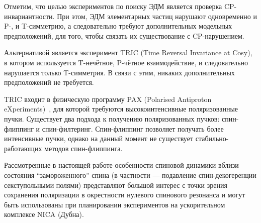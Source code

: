 
Отметим, что целью экспериментов по поиску ЭДМ является проверка CP-инвариантности. При этом, ЭДМ элементарных частиц нарушают одновременно и P-, и T-симметрию, а следовательно требуют дополнительных модельных предположений, для того, чтобы связать их существование с CP-нарушением.~\cite[стр.~1926]{Aksentev:TRIC}

Альтернативой является эксперимент TRIC (Time Reversal Invariance at Cosy),~\cite{Aksentev:TRIC} в котором используется T-нечётное, P-чётное взаимодействие, и следовательно нарушается только T-симметрия. В связи с этим, никаких дополнительных предположений не требуется.

TRIC входит в физическую программу PAX (Polarised Antiproton eXperiments)~\cite{Aksentev:PAX}, для которой требуются высокоинтенсивные поляризованные пучки. Существует два подхода к получению поляризованных пучков: спин-флиппинг и спин-филтеринг. Спин-флиппинг позволяет получать более интенсивные пучки, однако на данный момент не существует стабильно-работающих методов спин-флиппинга.

Рассмотренные в настоящей работе особенности спиновой динамики вблизи состояния ``замороженного'' спина (в частности --- подавление спин-декогеренции секступольными полями) представляют большой интерес с точки зрения сохранения поляризации в окрестности нулевого спинового резонанса и могут быть использованы при планировании экспериментов на ускорительном комплексе NICA (Дубна).